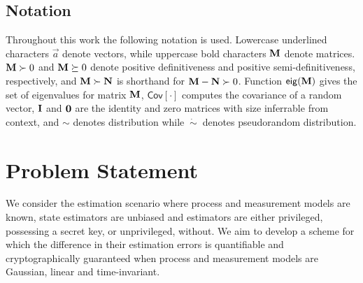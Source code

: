 \documentclass[letterpaper, 10 pt, conference]{IEEEtran}
\theoremstyle{definition}
\begin{document}
% 
% 

\subsection{Notation}
Throughout this work the following notation is used. Lowercase underlined characters $\vec{a}$ denote vectors, while uppercase bold characters ${{\mathbf{M}}}$ denote matrices. ${{\mathbf{M}}}\succ 0$ and ${{\mathbf{M}}} \succeq 0$ denote positive definitiveness and positive semi-definitiveness, respectively, and ${{\mathbf{M}}} \succ {\ensuremath{{\mathbf{N}}}}$ is shorthand for ${{\mathbf{M}}}-{{\mathbf{N}}}\succ 0$. Function $\mathsf{eig}({{\mathbf{M}}})$ gives the set of eigenvalues for matrix ${{\mathbf{M}}}$, $\mathsf{Cov}[\cdot]$ computes the covariance of a random vector, ${{\mathbf{I}}}$ and ${{\mathbf{0}}}$ are the identity and zero matrices with size inferrable from context, and $\sim$ denotes distribution while $\ \dot{\sim}\ $ denotes pseudorandom distribution.

% 
%                                              
%                                              
%                                              
% 

\section{Problem Statement}\label{sec:problem_statement}
We consider the estimation scenario where process and measurement models are known, state estimators are unbiased and estimators are either privileged, possessing a secret key, or unprivileged, without. We aim to develop a scheme for which the difference in their estimation errors is quantifiable and cryptographically guaranteed when process and measurement models are Gaussian, linear and time-invariant.
\end{document}
